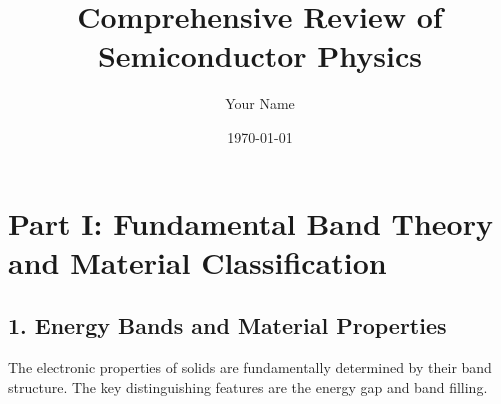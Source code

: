 \documentclass[12pt]{article}
\title{Comprehensive Review of Semiconductor Physics}
\author{Your Name}
\date{\today}
\begin{document}
\maketitle

\tableofcontents

\newpage

\section{Part I: Fundamental Band Theory and Material Classification}

\subsection{1. Energy Bands and Material Properties}

The electronic properties of solids are fundamentally determined by their band structure. The key distinguishing features are the energy gap and band filling.
\end{document}
